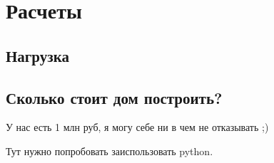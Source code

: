 \part{Расчеты}
\chapter{Нагрузка}

\chapter{Сколько стоит дом построить?}
У нас есть 1 млн руб, я могу себе ни в чем не отказывать ;)

Тут нужно попробовать заиспользовать python.

